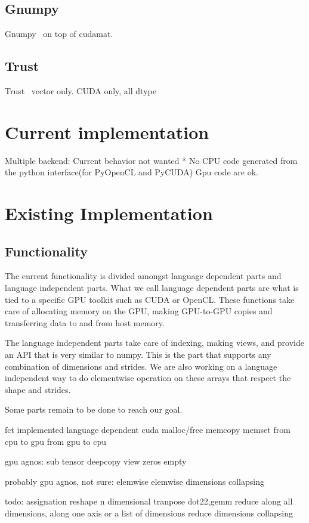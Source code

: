 \documentclass{article} %
\begin{document}
\subsection{Gnumpy}
Gnumpy~\citep{gnumpy-TR2010} on top of cudamat.
\subsection{Trust}
Trust~\citep{Thrust} vector only. CUDA only, all dtype

\section{Current implementation}
Multiple backend:
Current behavior not wanted
    * No CPU code generated from the python interface(for PyOpenCL and PyCUDA) Gpu code are ok.


\section{Existing Implementation}

\subsection{Functionality}

The current functionality is divided amongst language dependent parts and language independent parts.  What we call language dependent parts are what is tied to a specific GPU toolkit such as CUDA or OpenCL.  These functions take care of allocating memory on the GPU, making GPU-to-GPU copies and transferring data to and from host memory.  

The language independent parts take care of indexing, making views, and provide an API that is very similar to numpy.  This is the part that supports any combination of dimensions and strides.  We are also working on a language independent way to do elementwise operation on these arrays that respect the shape and strides.

Some parts remain to be done to reach our goal.

fct implemented language dependent
cuda
malloc/free
memcopy
memset
from cpu to gpu
from gpu to cpu

gpu agnos:
sub tensor
deepcopy
view
zeros
empty

probably gpu agnos, not sure:
elemwise
elemwise dimensions collapsing


todo:
assignation
reshape
n dimensional tranpose
dot22,gemm
reduce along all dimensions, along one axis or a list of dimensions
reduce dimensions collapsing
\end{document}
